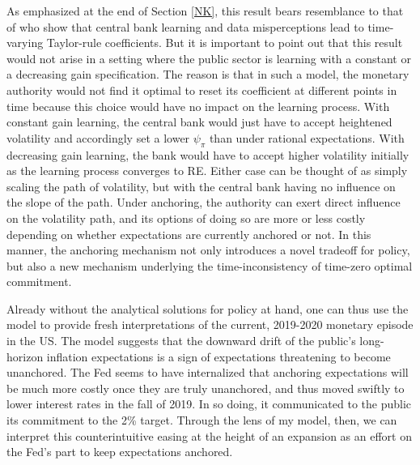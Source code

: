 \documentclass[11pt]{article}
\renewcommand{\[}{\begin{equation}}
\renewcommand{\]}{\end{equation}}
\begin{document}
As emphasized at the end of Section \ref{NK}, this result bears resemblance to that of \cite{LUBIK201685} who show that central bank learning and data misperceptions lead to time-varying Taylor-rule coefficients. But it is important to point out that this result would not arise in a setting where the public sector is learning with a constant or a decreasing gain specification. The reason is that in such a model, the monetary authority would not find it optimal to reset its coefficient at different points in time because this choice would have no impact on the learning process. With constant gain learning, the central bank would just have to accept heightened volatility and accordingly set a lower $\psi_{\pi}$ than under rational expectations. With decreasing gain learning, the bank would have to accept higher volatility initially as the learning process converges to RE. Either case can be thought of as simply scaling the path of volatility, but with the central bank having no influence on the slope of the path. Under anchoring, the authority can exert direct influence on the volatility path, and its options of doing so are more or less costly depending on whether expectations are currently anchored or not. In this manner, the anchoring mechanism not only introduces a novel tradeoff for policy, but also a new mechanism underlying the time-inconsistency of time-zero optimal commitment. 

Already without the analytical solutions for policy at hand, one can thus use the model to provide fresh interpretations of the current, 2019-2020 monetary episode in the US. The model suggests that the downward drift of the public's long-horizon inflation expectations is a sign of expectations threatening to become unanchored. The Fed seems to have internalized that anchoring expectations will be much more costly once they are truly unanchored, and thus moved swiftly to lower interest rates in the fall of 2019. In so doing, it communicated to the public its commitment to the 2\% target. Through the lens of my model, then, we can interpret this counterintuitive easing at the height of an expansion as an effort on the Fed's part to keep expectations anchored. 
\end{document}
